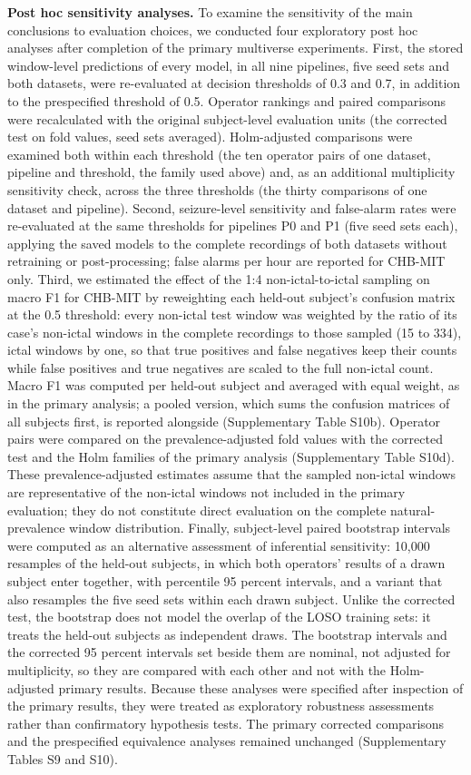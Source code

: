 \documentclass[11pt,a4paper]{article}
\begin{document}
\textbf{Post hoc sensitivity analyses.} To examine the sensitivity of the main conclusions to
evaluation choices, we conducted four exploratory post hoc analyses after completion of
the primary multiverse experiments. First, the stored window-level predictions of every
model, in all nine pipelines, five seed sets and both datasets, were re-evaluated at
decision thresholds of 0.3 and 0.7, in addition to the prespecified threshold of 0.5.
Operator rankings and paired comparisons were recalculated with the original
subject-level evaluation units (the corrected test on fold values, seed sets averaged).
Holm-adjusted comparisons were examined both within each threshold (the ten operator
pairs of one dataset, pipeline and threshold, the family used above) and, as an
additional multiplicity sensitivity check, across the three thresholds (the thirty
comparisons of one dataset and pipeline). Second, seizure-level sensitivity and
false-alarm rates were re-evaluated at the same thresholds for pipelines P0 and P1 (five
seed sets each), applying the saved models to the complete recordings of both datasets
without retraining or post-processing; false alarms per hour are reported for CHB-MIT
only. Third, we estimated the effect of the 1:4 non-ictal-to-ictal sampling on macro F1
for CHB-MIT by reweighting each held-out subject's confusion matrix at the 0.5
threshold: every non-ictal test window was weighted by the ratio of its case's non-ictal
windows in the complete recordings to those sampled (15 to 334), ictal windows by one,
so that true positives and false negatives keep their counts while false positives and
true negatives are scaled to the full non-ictal count. Macro F1 was computed per
held-out subject and averaged with equal weight, as in the primary analysis; a pooled
version, which sums the confusion matrices of all subjects first, is reported alongside
(Supplementary Table S10b). Operator pairs were compared on the prevalence-adjusted fold
values with the corrected test and the Holm families of the primary analysis
(Supplementary Table S10d). These prevalence-adjusted estimates assume that the sampled
non-ictal windows are representative of the non-ictal windows not included in the
primary evaluation; they do not constitute direct evaluation on the complete
natural-prevalence window distribution. Finally, subject-level paired bootstrap
intervals were computed as an alternative assessment of inferential sensitivity: 10,000
resamples of the held-out subjects, in which both operators' results of a drawn subject
enter together, with percentile 95 percent intervals, and a variant that also resamples
the five seed sets within each drawn subject. Unlike the corrected test, the bootstrap
does not model the overlap of the LOSO training sets: it treats the held-out subjects as
independent draws. The bootstrap intervals and the corrected 95 percent intervals set
beside them are nominal, not adjusted for multiplicity, so they are compared with each
other and not with the Holm-adjusted primary results. Because these analyses were
specified after inspection of the primary results, they were treated as exploratory
robustness assessments rather than confirmatory hypothesis tests. The primary corrected
comparisons and the prespecified equivalence analyses remained unchanged
(Supplementary Tables S9 and S10).
\end{document}
